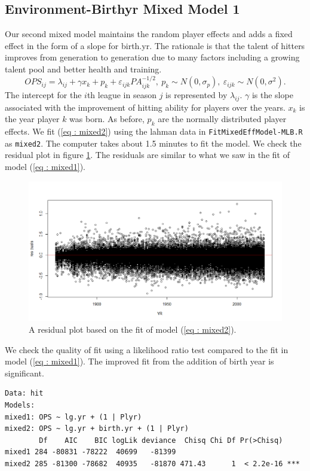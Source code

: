 \documentclass [52pt] {article}
\begin{document}
\subsection{Environment-Birthyr Mixed Model 1}
Our second mixed model maintains the random player effects and adds a fixed effect in the form of a slope for birth.yr.  The rationale is that the talent of hitters improves from generation to generation due to many factors including a growing talent pool and better health and training.
\begin{equation}\label{eq : mixed2}
OPS_{ij} = \lambda_{ij} + \gamma x_{k} +  p_k + \varepsilon_{ijk} PA_{ijk}^{-1/2},\:p_k\sim N(0,\sigma_p),\: \varepsilon_{ijk}\sim N(0,\sigma^2).
\end{equation}
The intercept for the $i$th league in season $j$ is represented by $\lambda_{ij}$.  $\gamma$ is the slope associated with the improvement of hitting ability for players over the years.  $x_k$ is the year player $k$ was born.  As before, $p_k$ are the normally distributed player effects.  We fit (\ref{eq : mixed2}) using the lahman data in \verb|FitMixedEffModel-MLB.R| as \verb|mixed2|.  The computer takes about 1.5 minutes to fit the model.  We check the residual plot in figure \ref{fig : mixed2res}.  The residuals are similar to what we saw in the fit of model (\ref{eq : mixed1}).

\begin{figure}[h!]
\centering
\includegraphics[scale = 0.5]{mixed2res.png}
\caption{\label{fig : mixed2res} A residual plot based on the fit of model (\ref{eq : mixed2}).}
\end{figure}
We check the quality of fit using a likelihood ratio test compared to the fit in model (\ref{eq : mixed1}).  The improved fit from the addition of birth year is significant.
\begin{verbatim}
Data: hit
Models:
mixed1: OPS ~ lg.yr + (1 | Plyr)
mixed2: OPS ~ lg.yr + birth.yr + (1 | Plyr)
        Df    AIC    BIC logLik deviance  Chisq Chi Df Pr(>Chisq)    
mixed1 284 -80831 -78222  40699   -81399                             
mixed2 285 -81300 -78682  40935   -81870 471.43      1  < 2.2e-16 ***
\end{verbatim}
\end{document}
